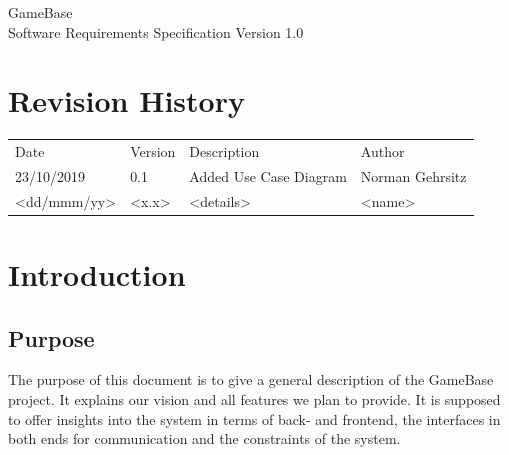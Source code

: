 \documentclass[a4paper,12pt,chapterprefix=false,bibliography=totoc,listof=totoc,]{scrreprt}
\begin{document}
	
\begin{flushright}
GameBase
\\
Software Requirements Specification
\bigbreak
Version 1.0
\end{flushright}
\chapter*{Revision History}
\begin{table}[H]
	\centering
	\everyrow{\hline}
	\begin{tabu} to \textwidth {|X[c]|X[c]|X[c]|X[c]|}
		Date & Version & Description & Author\\
		23/10/2019 & 0.1 & Added Use Case Diagram & Norman Gehrsitz\\
		<dd/mmm/yy> & <x.x> & <details> & <name>\\
	\end{tabu}
	\label{tab:rev-hist}
\end{table}

\tableofcontents

\chapter{Introduction}



\section{Purpose}
The purpose of this document is to give a general description of the GameBase project. It explains our vision and all features we plan to provide. It is supposed to offer insights into the system in terms of back- and frontend, the interfaces in both ends for communication and the constraints of the system.
\end{document}
